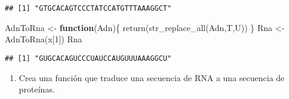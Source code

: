 \documentclass[
]{article}
\newenvironment{Shaded}{\begin{snugshade}}{\end{snugshade}}
\newcommand{\ControlFlowTok}[1]{\textcolor[rgb]{0.13,0.29,0.53}{\textbf{#1}}}
\newcommand{\DecValTok}[1]{\textcolor[rgb]{0.00,0.00,0.81}{#1}}
\newcommand{\FunctionTok}[1]{\textcolor[rgb]{0.00,0.00,0.00}{#1}}
\newcommand{\NormalTok}[1]{#1}
\newcommand{\OtherTok}[1]{\textcolor[rgb]{0.56,0.35,0.01}{#1}}
\newcommand{\StringTok}[1]{\textcolor[rgb]{0.31,0.60,0.02}{#1}}
\providecommand{\tightlist}{%
  \setlength{\itemsep}{0pt}\setlength{\parskip}{0pt}}
\begin{document}
\begin{verbatim}
## [1] "GTGCACAGTCCCTATCCATGTTTAAAGGCT"
\end{verbatim}

\begin{Shaded}
\begin{Highlighting}[]
\NormalTok{AdnToRna }\OtherTok{\textless{}{-}} \ControlFlowTok{function}\NormalTok{(Adn)\{}
  \FunctionTok{return}\NormalTok{(}\FunctionTok{str\_replace\_all}\NormalTok{(Adn,}\StringTok{\textquotesingle{}T\textquotesingle{}}\NormalTok{,}\StringTok{\textquotesingle{}U\textquotesingle{}}\NormalTok{))}
\NormalTok{\}}
\NormalTok{Rna }\OtherTok{\textless{}{-}} \FunctionTok{AdnToRna}\NormalTok{(x[}\DecValTok{1}\NormalTok{])}
\NormalTok{Rna}
\end{Highlighting}
\end{Shaded}

\begin{verbatim}
## [1] "GUGCACAGUCCCUAUCCAUGUUUAAAGGCU"
\end{verbatim}

\begin{enumerate}
\def\labelenumi{\arabic{enumi}.}
\setcounter{enumi}{4}
\tightlist
\item
  Crea una función que traduce una secuencia de RNA a una secuencia de
  proteínas.
\end{enumerate}
\end{document}
